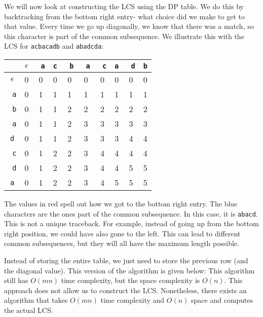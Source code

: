 \documentclass[a4paper, openany]{memoir}
\begin{document}
    We will now look at constructing the LCS using the DP table. We do this by backtracking from the bottom right entry- what choice did we make to get to that value. Every time we go up diagonally, we know that there was a match, so this character is part of the common subsequence. We illustrate this with the LCS for \texttt{acbacadb} and \texttt{abadcda}:
    \begin{table}[H]
        \centering
        \begin{tabular}{c|ccccccccc}
            & $\epsilon$ & \texttt{\color{blue} a} & \texttt{c} & \texttt{\color{blue} b} & \texttt{\color{blue} a} & \texttt{\color{blue} c} & \texttt{a} & \texttt{\color{blue} d} & \texttt{b} \\
            \hline 
            $\epsilon$ & {\color{red} 0} & 0 & 0 & 0 & 0 & 0 & 0 & 0 & 0 \\
            \texttt{\color{blue} a} & 0 & {\color{red} 1} & {\color{red} 1} & 1 & 1 & 1 & 1 & 1 & 1 \\
            \texttt{\color{blue} b} & 0 & 1 & 1 & {\color{red} 2} & 2 & 2 & 2 & 2 & 2 \\
            \texttt{\color{blue} a} & 0 & 1 & 1 & 2 & {\color{red} 3} & 3 & 3 & 3 & 3 \\
            \texttt{d} & 0 & 1 & 1 & 2 & {\color{red} 3} & 3 & 3 & 4 & 4 \\
            \texttt{\color{blue} c} & 0 & 1 & 2 & 2 & 3 & {\color{red} 4} & {\color{red} 4} & 4 & 4 \\
            \texttt{\color{blue} d} & 0 & 1 & 2 & 2 & 3 & 4 & 4 & {\color{red} 5} & {\color{red} 5} \\
            \texttt{a} & 0 & 1 & 2 & 2 & 3 & 4 & 5 & 5 & {\color{red} 5} 
        \end{tabular}
    \end{table}
    \noindent The values in red spell out how we got to the bottom right entry. The blue characters are the ones part of the common subsequence. In this case, it is \texttt{abacd}. This is not a unique traceback. For example, instead of going up from the bottom right position, we could have also gone to the left. This can lead to different common subsequences, but they will all have the maximum length possible.
    
    Instead of storing the entire table, we just need to store the previous row (and the diagonal value). This version of the algorithm is given below:
    This algorithm still has $O(mn)$ time complexity, but the space complexity is $O(n)$. This approach does not allow us to construct the LCS. Nonetheless, there exists an algorithm that takes $O(mn)$ time complexity and $O(n)$ space and computes the actual LCS.
    
\end{document}
